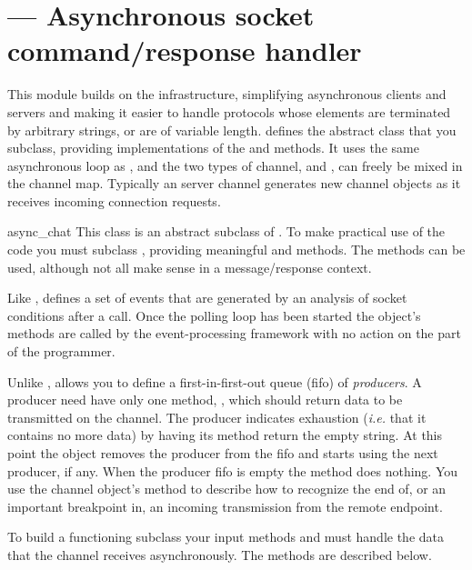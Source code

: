 \section{ ---
         Asynchronous socket command/response handler}


This module builds on the  infrastructure,
simplifying asynchronous clients and servers and making it easier to
handle protocols whose elements are terminated by arbitrary strings, or
are of variable length.  defines the abstract class
 that you subclass, providing implementations of the
 and 
methods. It uses the same asynchronous loop as , and
the two types of channel,  and
, can freely be mixed in the channel map.
Typically an  server channel generates new
 channel objects as it receives incoming
connection requests. 

\begin{classdesc}{async_chat}{}
  This class is an abstract subclass of . To make
  practical use of the code you must subclass , providing
  meaningful  and 
  methods. The  methods can be
  used, although not all make sense in a message/response context.  

  Like ,  defines a set of events
  that are generated by an analysis of socket conditions after a
   call. Once the polling loop has been started the
   object's methods are called by the event-processing
  framework with no action on the part of the programmer.

  Unlike ,  allows you to define
  a first-in-first-out queue (fifo) of \emph{producers}. A producer need have
  only one method, , which should return data to be transmitted
  on the channel. The producer indicates exhaustion (\emph{i.e.} that it contains
  no more data) by having its  method return the empty string. At
  this point the  object removes the producer from the fifo
  and starts using the next producer, if any. When the producer fifo is empty
  the  method does nothing. You use the channel object's
   method to describe how to recognize the end
  of, or an important breakpoint in, an incoming transmission from the
  remote endpoint.

  To build a functioning  subclass your 
  input methods  and
   must handle the data that the channel receives
  asynchronously. The methods are described below.
\end{classdesc}

